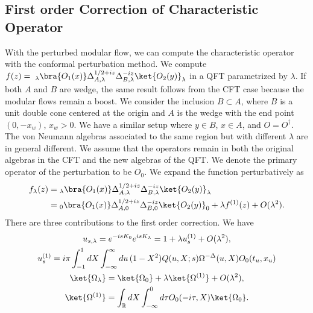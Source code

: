 \documentclass[a4paper,11pt]{article}
\theoremstyle{definition}
\theoremstyle{remark}
\newcommand{\KL}[1]{\textcolor{brown}{#1}}
\begin{document}





\subsection{First order Correction of Characteristic Operator}
With the perturbed modular flow, we can compute the characteristic operator with the conformal perturbation method. We compute $f(z)= \;_\lambda\bra{O_1(x)}\Delta_{A,\lambda}^{1/2+iz}\Delta_{B,\lambda}^{-iz}\ket{O_2(y)}_\lambda$ in a QFT parametrized by $\lambda$. If both $A$ and $B$ are wedge, the same result follows from the CFT case because the modular flows remain a boost. We consider the inclusion $B\subset A$, where $B$ is a unit double cone centered at the origin and $A$ is the wedge with the end point $(0,-x_w)$, $x_w >0$. We have a similar setup where $y\in B$, $x\in A$, and $O=O^\dagger$. The von Neumann algebras associated to the same region but with different $\lambda$ are in general different. We assume that the operators remain in both the original algebras in the CFT and the new algebras of the QFT. We denote the primary operator of the perturbation to be $O_0$. We expand the function perturbatively as
\begin{align}
    f_\lambda(z) =&\;_\lambda\bra{O_1(x)}\Delta_{A,\lambda}^{1/2+iz}\Delta_{B,\lambda}^{-iz}\ket{O_2(y)}_\lambda \\
    =&\; _0\bra{O_1(x)}\Delta_{A,0}^{1/2+iz}\Delta_{B,0}^{-iz}\ket{O_2(y)}_0 + \lambda f^{(1)}(z) + O(\lambda^2).
\end{align}
There are three contributions to the first order correction. We have
\begin{gather}
    u_{s,\lambda} = e^{-isK_0}e^{isK_\lambda} = 1 + \lambda u_{s}^{(1)} +O(\lambda^2),\\
    u_{s}^{(1)} = i\pi  \int_{-1}^1 dX \int_{-\infty}^{\infty} du \, (1-X^2) Q(u,X;s) \Omega^{-\Delta}(u,X) O_0(t_u,x_u)\\
    \ket{\Omega_\lambda} = \ket{\Omega_0} + \lambda\ket{\Omega^{(1)}} + O(\lambda^2),\\
    \ket{\Omega^{(1)}} = \int_\mathbb{R} dX \int_{-\infty}^{0} d\tau O_0(-i\tau,X) \ket{\Omega_0}.
\end{gather}
\end{document}
